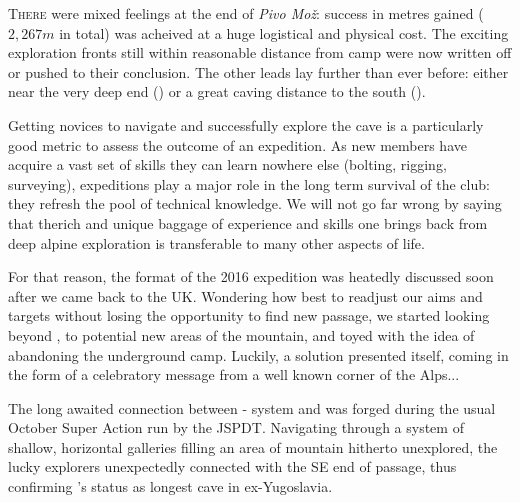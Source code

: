 \newpage
\thispagestyle{endchapter}

\begin{tcolorbox}
\vspace{80pt}
	\lettrine{T}{here} were mixed feelings at the end of \emph{Pivo Mo\v{z}}: success in metres gained ($2,267m$ in total) was acheived at a huge logistical and physical cost. The exciting exploration fronts still within reasonable distance from  camp were now written off or pushed to their conclusion. The other leads lay further than ever before: either near the very deep end () or a great caving distance to the south ().

	Getting novices to navigate and successfully explore the cave is a particularly good metric to assess the outcome of an expedition. As new members have acquire a vast set of skills they can learn nowhere else (bolting, rigging, surveying), expeditions play a major role in the long term survival of the club: they refresh the pool of technical knowledge. We will not go far wrong by saying that therich and unique baggage of experience and skills one brings back from deep alpine exploration is transferable to many other aspects of life.

	For that reason, the format of the 2016 expedition was heatedly discussed soon after we came back to the UK. Wondering how best to readjust our aims and targets without losing the opportunity to find new passage, we started looking beyond , to potential new areas of the mountain, and toyed with the idea of abandoning the underground camp. Luckily, a solution presented itself, coming in the form of a celebratory message from a well known corner of the Alps...

	The long awaited connection between  -  system and   was forged during the usual October Super Action run by the JSPDT. Navigating through a system of shallow, horizontal galleries filling an area of mountain hitherto unexplored, the lucky explorers unexpectedly connected with the SE end of  passage, thus confirming 's status as longest cave in ex-Yugoslavia.

	
\end{tcolorbox}
